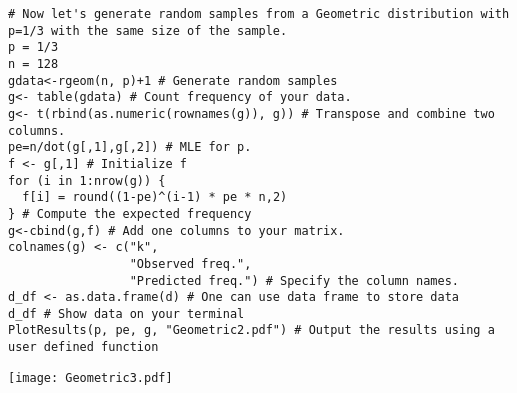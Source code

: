 \begin{frame}[fragile]

 \begin{lstlisting}
# Now let's generate random samples from a Geometric distribution with p=1/3 with the same size of the sample.
p = 1/3
n = 128
gdata<-rgeom(n, p)+1 # Generate random samples
g<- table(gdata) # Count frequency of your data.
g<- t(rbind(as.numeric(rownames(g)), g)) # Transpose and combine two columns.
pe=n/dot(g[,1],g[,2]) # MLE for p.
f <- g[,1] # Initialize f
for (i in 1:nrow(g)) {
  f[i] = round((1-pe)^(i-1) * pe * n,2)
} # Compute the expected frequency
g<-cbind(g,f) # Add one columns to your matrix.
colnames(g) <- c("k",
                 "Observed freq.",
                 "Predicted freq.") # Specify the column names.
d_df <- as.data.frame(d) # One can use data frame to store data
d_df # Show data on your terminal
PlotResults(p, pe, g, "Geometric2.pdf") # Output the results using a user defined function
 \end{lstlisting}

\end{frame}
\begin{frame}
	\begin{center}
		\texttt{[image: Geometric3.pdf]}
	\end{center}
\end{frame}
